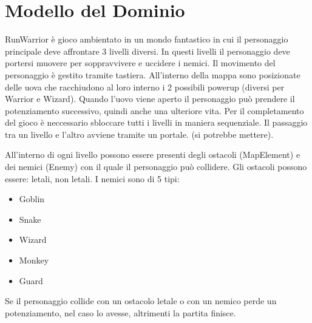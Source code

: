 \documentclass[a4paper,12pt]{report}
\begin{document}
\section{Modello del Dominio}
RunWarrior è gioco ambientato in un mondo fantastico in cui il personaggio principale deve affrontare 3 livelli diversi. In questi
livelli il personaggio deve portersi muovere per soppravvivere e uccidere i nemici. Il movimento del personaggio è gestito tramite tastiera.
All'interno della mappa sono posizionate delle uova che racchiudono al loro interno i 2 possibili powerup (diversi per Warrior e Wizard).
Quando l'uovo viene aperto il personaggio può prendere il potenziamento successivo, quindi anche una ulteriore vita.
Per il completamento del gioco è neccessario 
sbloccare tutti i livelli in maniera sequenziale. Il passaggio tra un livello e l'altro avviene tramite un portale. (si potrebbe
mettere).

All'interno di ogni livello possono essere presenti degli ostacoli (MapElement) e dei nemici (Enemy) con il quale il personaggio può collidere.
Gli ostacoli possono essere: letali, non letali. I nemici sono di 5 tipi:
\begin{itemize}
    \item Goblin
    \item Snake
    \item Wizard
    \item Monkey 
    \item Guard
\end{itemize}
Se il personaggio collide con un ostacolo letale o con un nemico perde un potenziamento, nel caso lo avesse, altrimenti la partita finisce.
\end{document}
